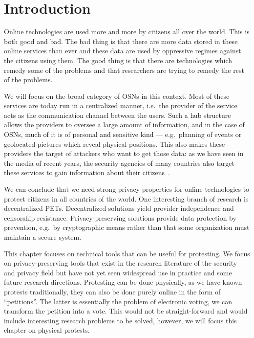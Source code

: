 \section{Introduction}
\label{Introduction}

Online technologies are used more and more by citizens all over the world.
This is both good and bad.
The bad thing is that there are more data stored in these online services than 
ever and these data are used by oppressive regimes against the citizens using 
them.
The good thing is that there are technologies which remedy some of the problems 
and that researchers are trying to remedy the rest of the problems.

We will focus on the broad category of \acp{OSN} in this context.
Most of these services are today run in a centralized manner, i.e.\ the 
provider of the service acts as the communication channel between the users.
Such a hub structure allows the providers to oversee a large amount of 
information, and in the case of \acp{OSN}, much of it is of personal and 
sensitive kind ---  e.g.\ planning of events or geolocated pictures which 
reveal physical positions.
This also makes these providers the target of attackers who want to get those 
data:
as we have seen in the media of recent years, the security agencies of many 
countries also target these services to gain information about their 
citizens~\cite{Prism}.

We can conclude that we need strong privacy properties for online technologies 
to protect citizens in all countries of the world.
One interesting branch of research is decentralized \acp{PET}.
Decentralized solutions yield provider independence and censorship resistance.
Privacy-preserving solutions provide data protection by prevention, e.g.\ by 
cryptographic means rather than that some organization must maintain a secure 
system.

This chapter focuses on technical tools that can be useful for protesting.
We focus on privacy-preserving tools that exist in the research literature of 
the security and privacy field but have not yet seen widespread use in practice 
and some future research directions.
Protesting can be done physically, as we have known protests traditionally, 
they can also be done purely online in the form of \enquote{petitions}.
The latter is essentially the problem of electronic voting, we can transform 
the petition into a vote.
This would not be straight-forward and would include interesting research 
problems to be solved, however, we will focus this chapter on physical 
protests.

